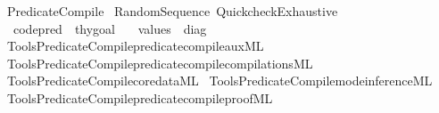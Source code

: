 %
\begin{isabellebody}%
%
%
\isadelimdocument
%
\endisadelimdocument
%
\isatagdocument
%
\isamarkuptrue%
%
\endisatagdocument
{\isafolddocument}%
%
\isadelimdocument
%
\endisadelimdocument
%
\isadelimtheory
%
\endisadelimtheory
%
\isatagtheory
{}\isamarkupfalse%
\ Predicate{\isacharunderscore}{\kern0pt}Compile\isanewline
{}\ Random{\isacharunderscore}{\kern0pt}Sequence\ Quickcheck{\isacharunderscore}{\kern0pt}Exhaustive\isanewline
{}\isanewline
\ \ {\isachardoublequoteopen}code{\isacharunderscore}{\kern0pt}pred{\isachardoublequoteclose}\ {\isacharcolon}{\kern0pt}{\isacharcolon}{\kern0pt}\ thy{\isacharunderscore}{\kern0pt}goal\ \isanewline
\ \ {\isachardoublequoteopen}values{\isachardoublequoteclose}\ {\isacharcolon}{\kern0pt}{\isacharcolon}{\kern0pt}\ diag\isanewline
{}%
\endisatagtheory
{\isafoldtheory}%
%
\isadelimtheory
\isanewline
%
\endisadelimtheory
%
\isadelimML
\isanewline
%
\endisadelimML
%
\isatagML
{}\isamarkupfalse%
\ {\isacartoucheopen}Tools{\isacharslash}{\kern0pt}Predicate{\isacharunderscore}{\kern0pt}Compile{\isacharslash}{\kern0pt}predicate{\isacharunderscore}{\kern0pt}compile{\isacharunderscore}{\kern0pt}aux{\isachardot}{\kern0pt}ML{\isacartoucheclose}\isanewline
{}\isamarkupfalse%
\ {\isacartoucheopen}Tools{\isacharslash}{\kern0pt}Predicate{\isacharunderscore}{\kern0pt}Compile{\isacharslash}{\kern0pt}predicate{\isacharunderscore}{\kern0pt}compile{\isacharunderscore}{\kern0pt}compilations{\isachardot}{\kern0pt}ML{\isacartoucheclose}\isanewline
{}\isamarkupfalse%
\ {\isacartoucheopen}Tools{\isacharslash}{\kern0pt}Predicate{\isacharunderscore}{\kern0pt}Compile{\isacharslash}{\kern0pt}core{\isacharunderscore}{\kern0pt}data{\isachardot}{\kern0pt}ML{\isacartoucheclose}\isanewline
{}\isamarkupfalse%
\ {\isacartoucheopen}Tools{\isacharslash}{\kern0pt}Predicate{\isacharunderscore}{\kern0pt}Compile{\isacharslash}{\kern0pt}mode{\isacharunderscore}{\kern0pt}inference{\isachardot}{\kern0pt}ML{\isacartoucheclose}\isanewline
{}\isamarkupfalse%
\ {\isacartoucheopen}Tools{\isacharslash}{\kern0pt}Predicate{\isacharunderscore}{\kern0pt}Compile{\isacharslash}{\kern0pt}predicate{\isacharunderscore}{\kern0pt}compile{\isacharunderscore}{\kern0pt}proof{\isachardot}{\kern0pt}ML{\isacartoucheclose}\isanewline

\end{isabellebody}
